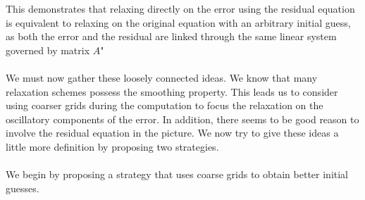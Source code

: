 \documentclass[11pt]{book}
\begin{document}
This demonstrates that relaxing directly on the error using the residual equation is equivalent to relaxing on the original equation with an arbitrary initial guess, as both the error and the residual are linked through the same linear system governed by matrix $A$"\\ \\
We must now gather these loosely connected ideas. We know that many relaxation schemes possess the smoothing property. This leads us to consider using coarser grids during the computation to focus the relaxation on the oscillatory components of the error. In addition, there seems to be good reason to involve the residual equation in the picture. We now try to give these ideas a little more definition by proposing two strategies. \\ \\
We begin by proposing a strategy that uses coarse grids to obtain better initial guesses.
\end{document}
